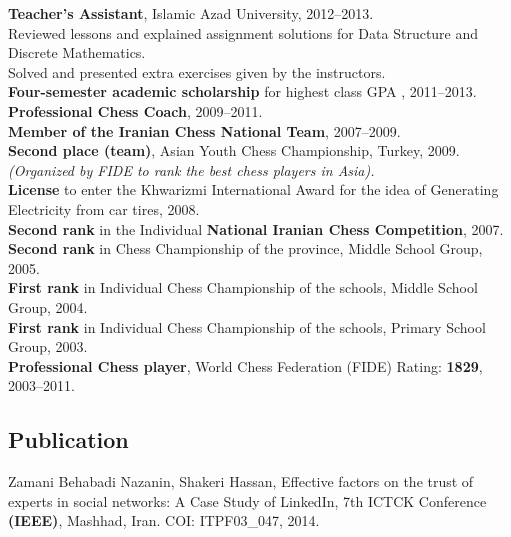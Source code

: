 \documentclass[10pt]{article}
\begin{document}
\noindent\textbf{Teacher’s Assistant}, Islamic Azad University, 2012--2013.\\
\indent Reviewed lessons and explained assignment solutions for Data Structure and Discrete Mathematics.\\
\indent Solved and presented extra exercises given by the instructors. \vspace{0.5mm}\\
\textbf{Four-semester academic scholarship} for highest class GPA , 2011--2013. \vspace{0.5mm}\\
\noindent\textbf {Professional Chess Coach}, 2009--2011. \vspace{0.5mm}\\
\noindent\textbf {Member of the Iranian Chess National Team}, 2007--2009. \vspace{0.5mm}\\
\textbf{Second place (team)}, Asian Youth Chess Championship, Turkey, 2009.\\ \indent \textit {(Organized by FIDE  to rank the best chess players in Asia).} \vspace{0.5mm} \\
\noindent\textbf {License }to enter the Khwarizmi International Award for the idea of Generating Electricity from car tires, 2008. \vspace{0.5mm}\\
\textbf{Second rank} in the Individual \textbf{National Iranian Chess Competition}, 2007. \vspace{0.5mm}\\
\textbf{Second rank} in Chess Championship of the province, Middle School Group, 2005. \vspace{0.5mm}\\
\textbf{First rank} in Individual Chess Championship of the schools, Middle School Group, 2004. \vspace{0.5mm}\\
\textbf{First rank} in Individual Chess Championship of the schools, Primary School Group, 2003. \vspace{0.5mm}\\
\noindent\textbf {Professional Chess player},  World Chess Federation (FIDE) Rating:  \textbf{1829}, 2003--2011.

\subsection*{Publication}

 Zamani Behabadi Nazanin, Shakeri Hassan, Effective factors on the trust of experts in social networks: A Case Study of LinkedIn, 7th ICTCK Conference\textbf{ (IEEE)}, Mashhad, Iran. COI:  ITPF03\_047, 2014.
\end{document}
